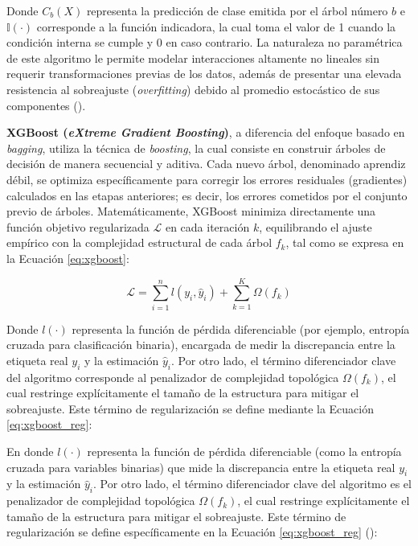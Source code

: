 Donde $C_b(X)$ representa la predicción de clase emitida por el árbol número $b$ e $\mathbb{I}(\cdot)$ corresponde a la función indicadora, la cual toma el valor de 1 cuando la condición interna se cumple y 0 en caso contrario. La naturaleza no paramétrica de este algoritmo le permite modelar interacciones altamente no lineales sin requerir transformaciones previas de los datos, además de presentar una elevada resistencia al sobreajuste (\textit{overfitting}) debido al promedio estocástico de sus componentes (\cite{hastie2009elements}).

\textbf{XGBoost (\textit{eXtreme Gradient Boosting})}, a diferencia del enfoque basado en \textit{bagging}, utiliza la técnica de \textit{boosting}, la cual consiste en construir árboles de decisión de manera secuencial y aditiva. Cada nuevo árbol, denominado aprendiz débil, se optimiza específicamente para corregir los errores residuales (gradientes) calculados en las etapas anteriores; es decir, los errores cometidos por el conjunto previo de árboles. Matemáticamente, XGBoost minimiza directamente una función objetivo regularizada $\mathcal{L}$ en cada iteración $k$, equilibrando el ajuste empírico con la complejidad estructural de cada árbol $f_k$, tal como se expresa en la Ecuación \ref{eq:xgboost}:

\begin{equation}
    \mathcal{L} = \sum_{i=1}^{n} l(y_i, \hat{y}_i) + \sum_{k=1}^{K} \Omega(f_k)
    \label{eq:xgboost}
\end{equation}

Donde $l(\cdot)$ representa la función de pérdida diferenciable (por ejemplo, entropía cruzada para clasificación binaria), encargada de medir la discrepancia entre la etiqueta real $y_i$ y la estimación $\hat{y}_i$. Por otro lado, el término diferenciador clave del algoritmo corresponde al penalizador de complejidad topológica $\Omega(f_k)$, el cual restringe explícitamente el tamaño de la estructura para mitigar el sobreajuste. Este término de regularización se define mediante la Ecuación \ref{eq:xgboost_reg}:

En donde $l(\cdot)$ representa la función de pérdida diferenciable (como la entropía cruzada para variables binarias) que mide la discrepancia entre la etiqueta real $y_i$ y la estimación $\hat{y}_i$. Por otro lado, el término diferenciador clave del algoritmo es el penalizador de complejidad topológica $\Omega(f_k)$, el cual restringe explícitamente el tamaño de la estructura para mitigar el sobreajuste. Este término de regularización se define específicamente en la Ecuación \ref{eq:xgboost_reg} (\cite{chen2016xgboost}):

